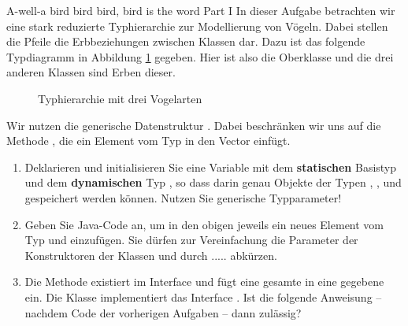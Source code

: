 \documentclass{../tuda-exercise}
\begin{document}
  \begin{task}[credit=\stars{1}{3}]{A-well-a bird bird bird, bird is the word Part I}
    \label{task:V3}
    In dieser Aufgabe betrachten wir eine stark reduzierte Typhierarchie zur Modellierung von
    Vögeln. Dabei stellen die Pfeile die Erbbeziehungen zwischen Klassen dar. Dazu ist das
    folgende Typdiagramm in Abbildung \ref{figure:V3} gegeben. Hier ist  also
    die Oberklasse und die drei anderen Klassen sind Erben dieser.

    \begin{figure}[h]
      \centering
      \caption{Typhierarchie mit drei Vogelarten}
      \label{figure:V3}
    \end{figure}

    Wir nutzen die generische Datenstruktur . Dabei beschränken wir uns auf
    die Methode , die ein Element vom Typ  in den
    Vector einfügt.

    \begin{enumerate}
      [label=(\arabic*):]
      \item Deklarieren und initialisieren Sie eine Variable  mit dem
      \textbf{statischen} Basistyp  und dem \textbf{dynamischen} Typ
      , so dass darin genau Objekte der Typen ,
      ,  und  gespeichert werden können.
      Nutzen Sie generische Typparameter!
      \item Geben Sie Java-Code an, um in den obigen  jeweils ein neues
      Element vom Typ  und  einzufügen. Sie dürfen zur
      Vereinfachung die Parameter der Konstruktoren der Klassen  und
       durch ..... abkürzen.
      \item Die Methode  existiert im Interface  und
      fügt eine gesamte  in eine gegebene  ein. Die
      Klasse  implementiert das Interface . Ist die
      folgende Anweisung – nachdem Code der vorherigen Aufgaben – dann zulässig?
      
    \end{enumerate}


\end{task}
\end{document}
